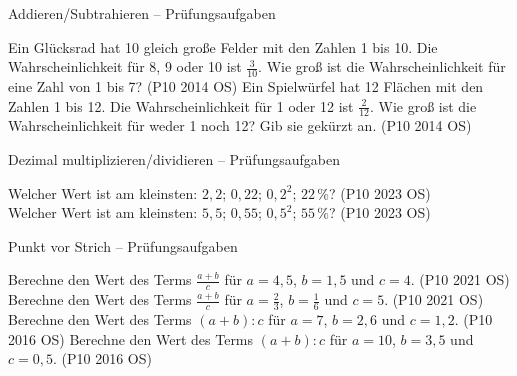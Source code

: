 \setcounter{aufgabe}{0}

\begin{aufgabe}{Addieren/Subtrahieren – Prüfungsaufgaben}
\begin{teile}
\teil Ein Glücksrad hat 10 gleich große Felder mit den Zahlen 1 bis 10. Die Wahrscheinlichkeit für 8, 9 oder 10 ist $\frac{3}{10}$. Wie groß ist die Wahrscheinlichkeit für eine Zahl von 1 bis 7? \hfill (P10 2014 OS)
\teil Ein Spielwürfel hat 12 Flächen mit den Zahlen 1 bis 12. Die Wahrscheinlichkeit für 1 oder 12 ist $\frac{2}{12}$. Wie groß ist die Wahrscheinlichkeit für weder 1 noch 12? Gib sie gekürzt an. \hfill (P10 2014 OS)
\end{teile}
\end{aufgabe}

\begin{aufgabe}{Dezimal multiplizieren/dividieren – Prüfungsaufgaben}
\begin{teile}
\teil Welcher Wert ist am kleinsten: $2{,}2$; $0{,}22$; $0{,}2^2$; $22\,\%$? \hfill (P10 2023 OS) \\ \leerfeld
\teil Welcher Wert ist am kleinsten: $5{,}5$; $0{,}55$; $0{,}5^2$; $55\,\%$? \hfill (P10 2023 OS) \\ \leerfeld
\end{teile}
\end{aufgabe}

\begin{aufgabe}{Punkt vor Strich – Prüfungsaufgaben}
\begin{teile}
\teil Berechne den Wert des Terms $\frac{a + b}{c}$ für $a = 4{,}5$, $b = 1{,}5$ und $c = 4$. \hfill (P10 2021 OS)
\teil Berechne den Wert des Terms $\frac{a + b}{c}$ für $a = \frac{2}{3}$, $b = \frac{1}{6}$ und $c = 5$. \hfill (P10 2021 OS)
\teil Berechne den Wert des Terms $(a + b) : c$ für $a = 7$, $b = 2{,}6$ und $c = 1{,}2$. \hfill (P10 2016 OS)
\teil Berechne den Wert des Terms $(a + b) : c$ für $a = 10$, $b = 3{,}5$ und $c = 0{,}5$. \hfill (P10 2016 OS)
\end{teile}
\end{aufgabe}
